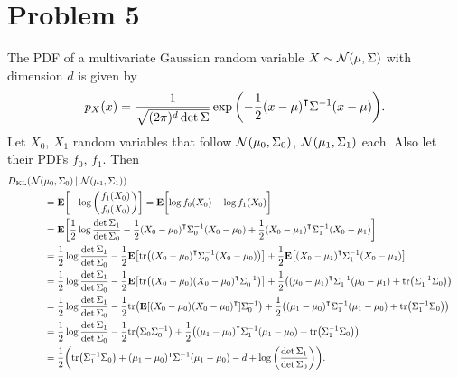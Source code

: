 \documentclass[10pt]{article}
\begin{document}
\section*{Problem 5}
The PDF of a multivariate Gaussian random variable $X \sim \mathcal{N}\qty(\mu, \Sigma)$ with dimension $d$ is given by 
\begin{equation*}
    p_X(x) = \frac{1}{\sqrt{(2\pi)^{d}\det\Sigma}}\exp\qty(-\frac{1}{2}\qty(x-\mu)^\intercal\Sigma^{-1}\qty(x-\mu)).
\end{equation*}
Let $X_0$, $X_1$ random variables that follow $\mathcal{N}\qty(\mu_0, \Sigma_0)$, $\mathcal{N}\qty(\mu_1, \Sigma_1)$ each.
Also let their PDFs $f_0$, $f_1$.
Then
\begin{align*}
    D_{\mathrm{KL}}\qty(\mathcal{N}\qty(\mu_0, \Sigma_0) || \mathcal{N}\qty(\mu_1, \Sigma_1)) \\
    &\hspace{-3cm}= \mathbf{E}\qty[-\log\qty(\frac{f_1(X_0)}{f_0(X_0)})] = \mathbf{E}\biggl[\log{f_0(X_0)} - \log{f_1(X_0)}\biggr] \\
    &\hspace{-3cm}= \mathbf{E}\qty[\frac{1}{2}\log\frac{\det\Sigma_1}{\det\Sigma_0} - \frac{1}{2}\qty(X_0-\mu_0)^\intercal\Sigma_0^{-1}\qty(X_0-\mu_0) + \frac{1}{2}\qty(X_0-\mu_1)^\intercal\Sigma_1^{-1}\qty(X_0-\mu_1)] \\
    &\hspace{-3cm}= \frac{1}{2}\log\frac{\det\Sigma_1}{\det\Sigma_0} - \frac{1}{2}\mathbf{E}\qty[\mathrm{tr}\qty(\qty(X_0-\mu_0)^\intercal\Sigma_0^{-1}\qty(X_0-\mu_0))] + \frac{1}{2}\mathbf{E}\qty[\qty(X_0-\mu_1)^\intercal\Sigma_1^{-1}\qty(X_0-\mu_1)] \\
    &\hspace{-3cm}= \frac{1}{2}\log\frac{\det\Sigma_1}{\det\Sigma_0} - \frac{1}{2}\mathbf{E}\qty[\mathrm{tr}\qty(\qty(X_0-\mu_0)\qty(X_0-\mu_0)^\intercal\Sigma_0^{-1})] + \frac{1}{2}\qty(\qty(\mu_0-\mu_1)^\intercal\Sigma_1^{-1}\qty(\mu_0-\mu_1) + \mathrm{tr}\qty(\Sigma_1^{-1}\Sigma_0)) \\
    &\hspace{-3cm}= \frac{1}{2}\log\frac{\det\Sigma_1}{\det\Sigma_0} - \frac{1}{2}\mathrm{tr}\qty(\mathbf{E}\qty[\qty(X_0-\mu_0)\qty(X_0-\mu_0)^\intercal]\Sigma_0^{-1}) + \frac{1}{2}\qty(\qty(\mu_1-\mu_0)^\intercal\Sigma_1^{-1}\qty(\mu_1-\mu_0) + \mathrm{tr}\qty(\Sigma_1^{-1}\Sigma_0)) \\
    &\hspace{-3cm}= \frac{1}{2}\log\frac{\det\Sigma_1}{\det\Sigma_0} - \frac{1}{2}\mathrm{tr}\qty(\Sigma_0\Sigma_0^{-1}) + \frac{1}{2}\qty(\qty(\mu_1-\mu_0)^\intercal\Sigma_1^{-1}\qty(\mu_1-\mu_0) + \mathrm{tr}\qty(\Sigma_1^{-1}\Sigma_0)) \\
    &\hspace{-3cm}= \frac{1}{2}\qty(\mathrm{tr}\qty(\Sigma_1^{-1}\Sigma_0) + \qty(\mu_1-\mu_0)^\intercal\Sigma_1^{-1}\qty(\mu_1-\mu_0) - d + \log\qty(\frac{\det\Sigma_1}{\det\Sigma_0})).
\end{align*}
\end{document}

